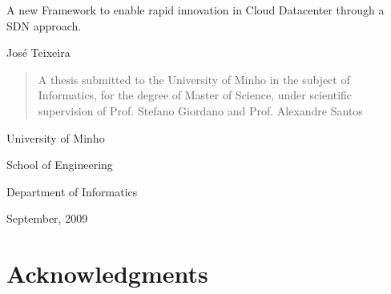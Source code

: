 \documentclass[12pt,english]{book}
\begin{document}
\begin{minipage}[c]{1.0\columnwidth}%
\begin{doublespace}
\vspace{2cm}
\begin{center}{\huge A new Framework to enable rapid innovation in Cloud Datacenter through a SDN approach.}\end{center}{\huge \par}
\end{doublespace}

\vspace{2cm}
\begin{center}{\large Jos\'{e} Teixeira}\end{center}{\large \par}
\vspace{2cm}

\begin{quote}
\begin{center}A thesis submitted to the University of Minho in the
subject of Informatics, for the degree of
Master of Science, under scientific supervision of Prof. Stefano Giordano and Prof. Alexandre Santos\end{center}\vspace{3cm}

\end{quote}
\begin{singlespace}
\begin{center}University of Minho\end{center}

\begin{center}School of Engineering\end{center}

\begin{center}Department of Informatics\end{center}
\end{singlespace}

\begin{center}{\large September, 2009}\end{center}\end{minipage}%
\thispagestyle{empty}



\newpage


\chapter*{Acknowledgments}
\end{document}
